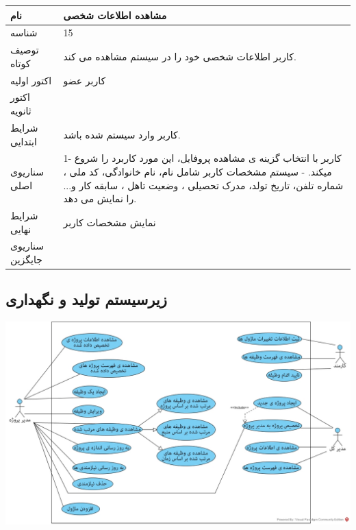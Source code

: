 \documentclass{article}
\begin{document}
\vspace{2cm}

\begin{tabular}{|p{2cm}|p{10cm}|}
\hline
نام
&
مشاهده اطلاعات شخصی
\\
\hline
شناسه
&
15
\\
\hline
توصیف کوتاه
&
کاربر اطلاعات شخصی خود را در سیستم مشاهده می کند.
\\
\hline
اکتور اولیه
&
کاربر عضو
\\
\hline
اکتور ثانویه
&

\\
\hline
شرایط ابتدایی
&
کاربر وارد سیستم شده باشد.
\\
\hline
سناریوی اصلی
&
1- کاربر با انتخاب گزینه ی مشاهده پروفایل، این مورد کاربرد را شروع میکند.
\newline
2- سیستم مشخصات کاربر شامل نام، نام خانوادگی، کد ملی ، شماره تلفن، تاریخ تولد، مدرک تحصیلی ، وضعیت تاهل ، سابقه کار و... را نمایش می دهد. 
\\
\hline
شرایط نهایی
&
نمایش مشخصات کاربر
\\
\hline
سناریوی جایگزین
&

\\
\hline
\end{tabular}


\newpage
\subsection{زیرسیستم تولید و نگهداری}

\vspace{2cm}
\begin{center}
\includegraphics[width=\textwidth]{Diagrams/Development.jpg}
\end{center}

\newpage
\end{document}
